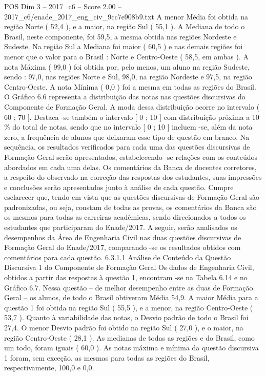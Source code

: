 \begin{textsample}{POS Dim 3 – 2017\_c6 – Score 2.00 – 2017\_c6/enade\_2017\_eng\_civ\_9cc7e908b9.txt}
A menor Média foi obtida na região Norte ( 52,4 ), e a maior, na região Sul ( 55,1 ).
A Mediana de todo o Brasil, neste componente, foi 59,5, a mesma obtida nas regiões Nordeste e Sudeste.
Na região Sul a Mediana foi maior ( 60,5 ) e nas demais regiões foi menor que o valor para o Brasil : Norte e Centro-Oeste ( 58,5, em ambas ).
A nota Máxima ( 99,0 ) foi obtida por, pelo menos, um aluno na região Sudeste, sendo : 97,0, nas regiões Norte e Sul, 98,0, na região Nordeste e 97,5, na região Centro-Oeste.
A nota Mínima ( 0,0 ) foi a mesma em todas as regiões do Brasil.
O Gráfico 6.6 representa a distribuição das notas nas questões discursivas do Componente de Formação Geral.
A moda dessa distribuição ocorre no intervalo ( 60 ; 70 ].
Destaca -se também o intervalo [ 0 ; 10 ] com distribuição próxima a 10 \% do total de notas, sendo que no intervalo [ 0 ; 10 ] incluem -se, além da nota zero, a frequência de alunos que deixaram esse tipo de questão em branco.
Na sequência, os resultados verificados para cada uma das questões discursivas de Formação Geral serão apresentados, estabelecendo -se relações com os conteúdos abordados em cada uma delas.
Os comentários da Banca de docentes corretores, a respeito do observado na correção das respostas dos estudantes, suas impressões e conclusões serão apresentados junto à análise de cada questão.
Cumpre esclarecer que, tendo em vista que as questões discursivas de Formação Geral são padronizadas, ou seja, constam de todas as provas, os comentários da Banca são os mesmos para todas as carreiras acadêmicas, sendo direcionados a todos os estudantes que participaram do Enade/2017.
A seguir, serão analisados os desempenhos da Área de Engenharia Civil nas duas questões discursivas de Formação Geral do Enade/2017, comparando -se os resultados obtidos com comentários para cada questão. 6.3.1.1 Análise de Conteúdo da Questão Discursiva 1 do Componente de Formação Geral Os dados de Engenharia Civil, obtidos a partir das respostas à questão 1, encontram -se na Tabela 6.14 e no Gráfico 6.7.
Nessa questão – de melhor desempenho entre as duas de Formação Geral – os alunos, de todo o Brasil obtiveram Média 54,9.
A maior Média para a questão 1 foi obtida na região Sul ( 55,5 ), e a menor, na região Centro-Oeste ( 53,7 ).
Quanto à variabilidade das notas, o Desvio padrão de todo o Brasil foi 27,4.
O menor Desvio padrão foi obtido na região Sul ( 27,0 ), e o maior, na região Centro-Oeste ( 28,1 ).
As medianas de todas as regiões e do Brasil, como um todo, foram iguais ( 60,0 ).
As notas máxima e mínima da questão discursiva 1 foram, sem exceção, as mesmas para todas as regiões do Brasil, respectivamente, 100,0 e 0,0.

\end{textsample}
